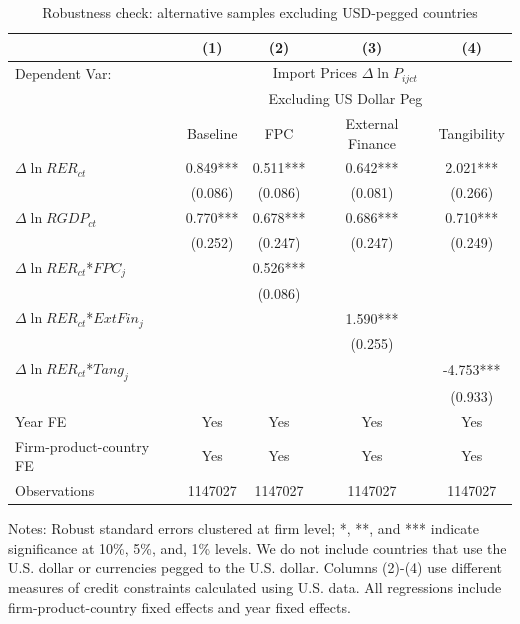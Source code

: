 \begin{table}[H]
	\centering
	\caption{Robustness check: alternative samples excluding USD-pegged countries}
	\begin{threeparttable}
	\begin{tabular}{lcccc}
		\toprule
		& (1)   & (2)   & (3)   & (4) \\
		\midrule
            Dependent Var: & \multicolumn{4}{c}{ Import Prices $\Delta \ln P_{ijct}$} \\
		& \multicolumn{4}{c}{Excluding US Dollar Peg} \\
		& Baseline & FPC   & External Finance & Tangibility \\
		\midrule
		$\Delta \ln RER_{ct}$ & 0.849*** & 0.511*** & 0.642*** & 2.021*** \\
		& (0.086) & (0.086) & (0.081) & (0.266) \\
		$\Delta \ln RGDP_{ct}$ & 0.770*** & 0.678*** & 0.686*** & 0.710*** \\
		& (0.252) & (0.247) & (0.247) & (0.249) \\
		$\Delta \ln RER_{ct}$*$FPC_{j}$ &    & 0.526*** &       &  \\
            & & (0.086) &       &  \\
		$\Delta \ln RER_{ct}$*$ExtFin_{j}$ & &       & 1.590*** &  \\
		& &       & (0.255) &  \\
		$\Delta \ln RER_{ct}$*$Tang_{j}$ & &       &       & -4.753*** \\
		& &       &       & (0.933) \\
            \midrule
		Year FE  &   Yes    & Yes   & Yes   & Yes \\
		Firm-product-country FE &   Yes    & Yes   & Yes   & Yes \\
		Observations & 1147027 & 1147027 & 1147027 & 1147027 \\
		\bottomrule
	\end{tabular}
	\begin{tablenotes}
		\footnotesize
		\item Notes: Robust standard errors clustered at firm level; *, **, and *** indicate significance at 10\%, 5\%, and, 1\% levels. We do not include countries that use the U.S. dollar or currencies pegged to the U.S. dollar. Columns (2)-(4) use different measures of credit constraints calculated using U.S. data. All regressions include firm-product-country fixed effects and year fixed effects.
	\end{tablenotes}
        \end{threeparttable}
        \label{tab.robust.nopeg}
\end{table}

